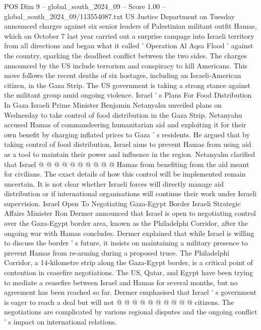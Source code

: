 \begin{textsample}{POS Dim 9 – global\_south\_2024\_09 – Score 1.00 – global\_south\_2024\_09/113554087.txt}  \label{ex:f9_pos_341}
US Justice Department on Tuesday announced charges against six senior leaders of Palestinian militant outfit Hamas, which on October 7 last year carried out a surprise rampage into Israeli territory from all directions and began what it called ' Operation Al Aqsa Flood ' against the country, sparking the deadliest conflict between the two sides.
The charges announced by the US include terrorism and conspiracy to kill Americans.
This move follows the recent deaths of six hostages, including an Israeli-American citizen, in the Gaza Strip.
The US government is taking a strong stance against the militant group amid ongoing violence.
Israel ' s Plans For Food Distribution In Gaza Israeli Prime Minister Benjamin Netanyahu unveiled plans on Wednesday to take control of food distribution in the Gaza Strip.
Netanyahu accused Hamas of commandeering humanitarian aid and exploiting it for their own benefit by charging inflated prices to Gaza ' s residents.
He argued that by taking control of food distribution, Israel aims to prevent Hamas from using aid as a tool to maintain their power and influence in the region.
Netanyahu clarified that Israel @ @ @ @ @ @ @ @ @ @ Hamas from benefiting from the aid meant for civilians.
The exact details of how this control will be implemented remain uncertain.
It is not clear whether Israeli forces will directly manage aid distribution or if international organisations will continue their work under Israeli supervision.
Israel Open To Negotiating Gaza-Egypt Border Israeli Strategic Affairs Minister Ron Dermer announced that Israel is open to negotiating control over the Gaza-Egypt border area, known as the Philadelphi Corridor, after the ongoing war with Hamas concludes.
Dermer explained that while Israel is willing to discuss the border ' s future, it insists on maintaining a military presence to prevent Hamas from re-arming during a proposed truce.
The Philadelphi Corridor, a 14-kilometre strip along the Gaza-Egypt border, is a critical point of contention in ceasefire negotiations.
The US, Qatar, and Egypt have been trying to mediate a ceasefire between Israel and Hamas for several months, but no agreement has been reached so far.
Dermer emphasised that Israel ' s government is eager to reach a deal but will not @ @ @ @ @ @ @ @ @ @ citizens.
The negotiations are complicated by various regional disputes and the ongoing conflict ' s impact on international relations.

\end{textsample}
